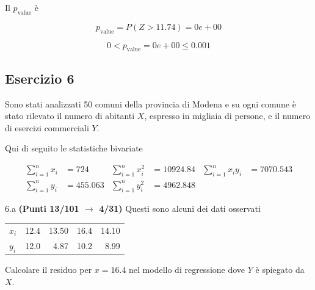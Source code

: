 \documentclass[
  11pt,
]{book}
\theoremstyle{mytheoremstyle}
\theoremstyle{mydefstyle}
\newenvironment{sol}
  {
  \begin{tcolorbox}[enhanced,breakable,arc=0.1mm,boxrule=1pt,colback=white,colframe=iblue,
  title=\bf \fontfamily{lmss}\selectfont \hspace{.5 cm} Soluzione,drop fuzzy shadow]

}{
\end{tcolorbox}
  }
\begin{document}
\begin{sol}
Il \(p_{\text{value}}\) è

\[ p_{\text{value}} = P(Z>11.74)=0e+00 \]

\[
 0 < p_\text{value}= 0e+00 \leq 0.001 
\]

\end{sol}

\subsection{Esercizio 6}\label{esercizio-6-13}

Sono stati analizzati 50 comuni della provincia di Modena e su ogni comune è stato rilevato
il numero di abitanti \(X\), espresso in migliaia di persone, e il numero di esercizi commerciali \(Y\).

Qui di seguito le statistiche bivariate

\begin{align*}
  \sum_{i=1}^n x_i &= 724 &\sum_{i=1}^n x_i^2 &= 10924.84 &\sum_{i=1}^n x_i y_i &= 7070.543\\
  \sum_{i=1}^n y_i &= 455.063 & \sum_{i=1}^n y_i^2 &= 4962.848 &
\end{align*}

6.a \textbf{(Punti 13/101 \(\rightarrow\) 4/31)} Questi sono alcuni dei dati osservati

\begin{table}[H]
\centering
\begin{tabular}{lrrrr}
\toprule
  &  &  &  & \\
\midrule
$x_i$ & 12.4 & 13.50 & 16.4 & 14.10\\
$y_i$ & 12.0 & 4.87 & 10.2 & 8.99\\
\bottomrule
\end{tabular}
\end{table}

Calcolare il residuo per \(x=16.4\) nel modello di regressione dove \(Y\) è spiegato da \(X\).
\end{document}
